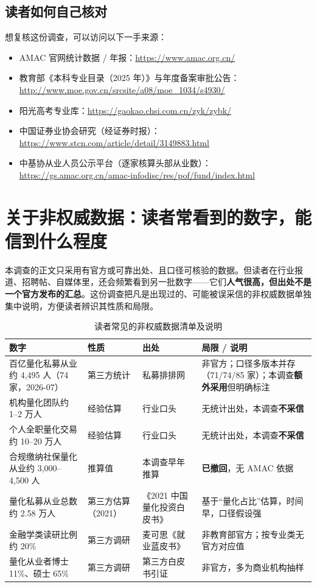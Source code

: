 \documentclass[UTF8,11pt]{ctexart}
\begin{document}
\subsection{读者如何自己核对}
想复核这份调查，可以访问以下一手来源：
\begin{itemize}
\item AMAC 官网统计数据 / 年报：\url{https://www.amac.org.cn/}
\item 教育部《本科专业目录（2025 年）》与年度备案审批公告：\url{http://www.moe.gov.cn/srcsite/a08/moe_1034/s4930/}
\item 阳光高考专业库：\url{https://gaokao.chsi.com.cn/zyk/zybk/}
\item 中国证券业协会研究（经证券时报）：\url{https://www.stcn.com/article/detail/3149883.html}
\item \small 中基协从业人员公示平台（逐家核算头部从业数）：\url{https://gs.amac.org.cn/amac-infodisc/res/pof/fund/index.html}
\end{itemize}

\section{关于非权威数据：读者常看到的数字，能信到什么程度}

本调查的正文只采用有官方或可靠出处、且口径可核验的数据。但读者在行业报道、招聘帖、自媒体里，还会频繁看到另一批数字——它们\textbf{人气很高，但出处不是一个官方发布的汇总}。这份调查把凡是出现过的、可能被误采信的非权威数据单独集中说明，方便读者辨识其性质和局限。

\begin{table}[ht]
\centering
\small
\begin{tabular}{@{}>{\raggedright\arraybackslash}p{3.4cm}>{\raggedright\arraybackslash}p{2.0cm}>{\raggedright\arraybackslash}p{2.4cm}>{\raggedright\arraybackslash}p{3.8cm}@{}}
\toprule
\textbf{数字} & \textbf{性质} & \textbf{出处} & \textbf{局限 / 说明} \\
\midrule
百亿量化私募从业约 4,495 人（74 家，2026-07） & 第三方统计 & 私募排排网 & 非官方；口径多版本并存（71/74/85 家）；本调查\textbf{额外采用}但明确标注 \\
机构量化团队约 1--2 万人 & 经验估算 & 行业口头 & 无统计出处，本调查\textbf{不采信} \\
个人全职量化交易约 10--20 万人 & 经验估算 & 行业口头 & 无统计出处，本调查\textbf{不采信} \\
合规缴纳社保量化从业约 3,000--4,500 人 & 推算值 & 本调查早年推算 & \textbf{已撤回}，无 AMAC 依据 \\
量化私募从业总数约 2.58 万人 & 第三方估算（2021） & 《2021 中国量化投资白皮书》 & 基于“量化占比”估算，时间早，口径假设强 \\
金融学类读研比例约 20\% & 第三方调研 & 麦可思《就业蓝皮书》 & 非教育部官方；按专业类无官方对应值 \\
量化从业者博士 11\%、硕士 65\% & 第三方调研 & 第三方白皮书引证 & 非官方，多为商业机构抽样 \\
\bottomrule
\end{tabular}
\caption{读者常见的非权威数据清单及说明}
\end{table}
\end{document}
